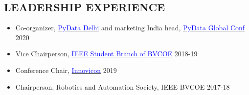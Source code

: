 \documentclass[11pt]{res} %
\newcommand{\titlegap}{5pt} %
\newcommand{\sectgap}{0.05in} %
\begin{document}
\begin{resume}
\section{LEADERSHIP EXPERIENCE}
\vspace{0.25in}
\begin{itemize}
    \item Co-organizer, \href{delhi.pydata.org}{\textcolor{blue}{PyData Delhi}} and marketing India head, \href{global.pydata.org}{\textcolor{blue}{PyData Global Conf}} \hfill 2020
    \item Vice Chairperson, \href{https://bvpieeend.com}{\textcolor{blue}{IEEE Student Branch of BVCOE}} \hfill 2018-19
    \item Conference Chair, \href{https://bvpieeend.com/innovicon/}{\textcolor{blue}{Innovicon}} \hfill 2019
    \item Chairperson, Robotics and Automation Society, IEEE BVCOE \hfill 2017-18
    
\end{itemize}


\vspace{\sectgap} 
\hline








\end{resume}
\end{document}
